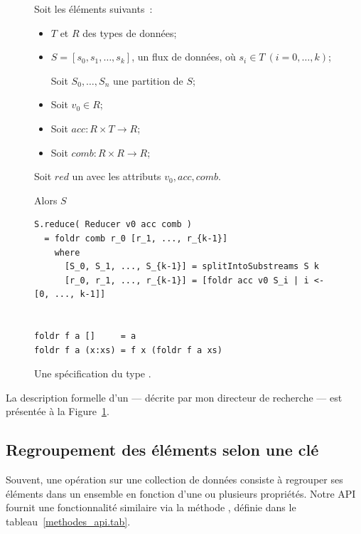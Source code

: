 \begin{figure}

\begin{framed}
Soit les \'el\'ements suivants~: 

\begin{itemize}

\item $T$ et $R$ des types de donn\'ees;

\item $S = [s_0, s_1, \ldots, s_k]$, un flux de donn\'ees, o\`u $s_i
\in T~(i=0, \ldots, k)$;

Soit $S_0, \ldots, S_n$ une partition de $S$;

\item Soit $v_0\in R$;

\item Soit $acc: R\times T \rightarrow R$;

\item Soit $comb: R\times R \rightarrow R$;


\end{itemize}

Soit $red$ un  avec les attributs $v_0, acc, comb$.

Alors $S$


\begin{verbatim}
S.reduce( Reducer v0 acc comb )
  = foldr comb r_0 [r_1, ..., r_{k-1}]
    where
      [S_0, S_1, ..., S_{k-1}] = splitIntoSubstreams S k
      [r_0, r_1, ..., r_{k-1}] = [foldr acc v0 S_i | i <- [0, ..., k-1]]


foldr f a []     = a
foldr f a (x:xs) = f x (foldr f a xs)
\end{verbatim}
\end{framed}

\caption{Une sp\'ecification du type .}
\label{reducer-spec.fig}
\end{figure}

La description formelle d'un  --- d\'ecrite par mon directeur de recherche --- est pr\'esent\'ee \`a la Figure~\ref{reducer-spec.fig}.



\subsection{Regroupement des \'el\'ements selon une cl\'e}

Souvent, une op\'eration sur une collection de donn\'ees consiste \`a regrouper ses \'el\'ements dans un ensemble en fonction d'une ou plusieurs propri\'et\'es. Notre {API} fournit une fonctionnalit\'e similaire via la m\'ethode , d\'efinie dans le tableau~\ref{methodes_api.tab}. 


